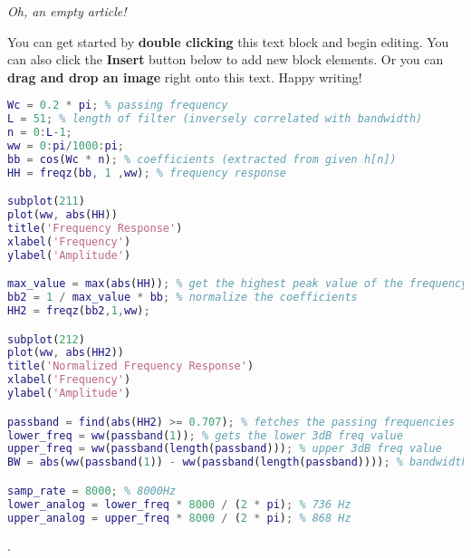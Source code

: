 \textit{Oh, an empty article!} 

You can get started by \textbf{double clicking} this text block and begin editing. You can also click the \textbf{Insert} button below to add new block elements. Or you can \textbf{drag and drop an image} right onto this text. Happy writing!

\begin{lstlisting}[language=MATLAB]
Wc = 0.2 * pi; % passing frequency
L = 51; % length of filter (inversely correlated with bandwidth)
n = 0:L-1;
ww = 0:pi/1000:pi;
bb = cos(Wc * n); % coefficients (extracted from given h[n])
HH = freqz(bb, 1 ,ww); % frequency response

subplot(211)
plot(ww, abs(HH))
title('Frequency Response')
xlabel('Frequency')
ylabel('Amplitude')

max_value = max(abs(HH)); % get the highest peak value of the frequency response
bb2 = 1 / max_value * bb; % normalize the coefficients
HH2 = freqz(bb2,1,ww);

subplot(212)
plot(ww, abs(HH2))
title('Normalized Frequency Response')
xlabel('Frequency')
ylabel('Amplitude')

passband = find(abs(HH2) >= 0.707); % fetches the passing frequencies
lower_freq = ww(passband(1)); % gets the lower 3dB freq value
upper_freq = ww(passband(length(passband))); % upper 3dB freq value
BW = abs(ww(passband(1)) - ww(passband(length(passband)))); % bandwidth

samp_rate = 8000; % 8000Hz
lower_analog = lower_freq * 8000 / (2 * pi); % 736 Hz
upper_analog = upper_freq * 8000 / (2 * pi); % 868 Hz
\end{lstlisting}.